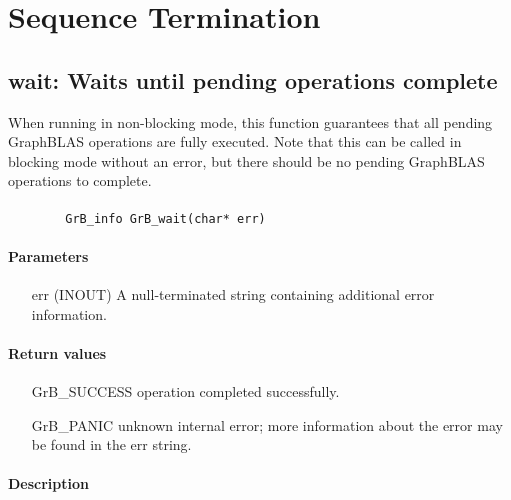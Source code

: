 \section{Sequence Termination}


\subsection{{\sf wait}: Waits until pending operations complete}
\label{Sec:wait}

When running in non-blocking mode, this function guarantees that all pending GraphBLAS operations are fully executed.  Note that this can be called in blocking mode without an error, but there should be no pending GraphBLAS operations to complete.

\paragraph{\syntax}

\begin{verbatim}
        GrB_info GrB_wait(char* err)
\end{verbatim}

\paragraph{Parameters}
\begin{itemize}[leftmargin=1.1in]
\item[{\sf err}] ({\sf INOUT})  A null-terminated string containing additional error
information.
\end{itemize}

\paragraph{Return values}
\begin{itemize}[leftmargin=2.1in]
\item[{\sf GrB\_SUCCESS}]	operation completed successfully.
\item[{\sf GrB\_PANIC}]		unknown internal error; more information about the error may be found in the {\sf err} string.
\end{itemize}

\paragraph{Description}

